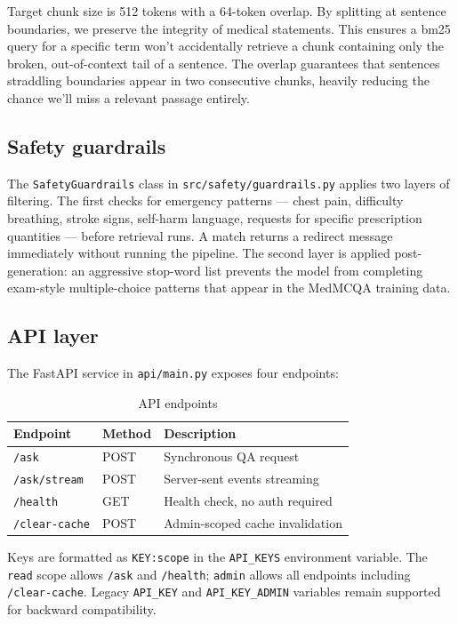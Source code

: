 Target chunk size is 512 tokens with a 64-token overlap. By splitting at sentence boundaries, we preserve the integrity of medical statements. This ensures a \ac{bm25} query for a specific term won't accidentally retrieve a chunk containing only the broken, out-of-context tail of a sentence. The overlap guarantees that sentences straddling boundaries appear in two consecutive chunks, heavily reducing the chance we'll miss a relevant passage entirely.

\subsection{Safety guardrails}

The \texttt{SafetyGuardrails} class in \texttt{src/safety/guardrails.py} applies two layers of filtering. The first checks for emergency patterns --- chest pain, difficulty breathing, stroke signs, self-harm language, requests for specific prescription quantities --- before retrieval runs. A match returns a redirect message immediately without running the pipeline. The second layer is applied post-generation: an aggressive stop-word list prevents the model from completing exam-style multiple-choice patterns that appear in the MedMCQA training data.

\subsection{API layer}

The FastAPI service in \texttt{api/main.py} exposes four endpoints:

\begin{table}[htbp]
\centering
\caption{API endpoints}
\renewcommand{\arraystretch}{1.3}
\begin{tabular}{|l|l|l|}
\hline
\textbf{Endpoint} & \textbf{Method} & \textbf{Description} \\
\hline
\texttt{/ask} & POST & Synchronous QA request \\
\texttt{/ask/stream} & POST & Server-sent events streaming \\
\texttt{/health} & GET & Health check, no auth required \\
\texttt{/clear-cache} & POST & Admin-scoped cache invalidation \\
\hline
\end{tabular}
\end{table}

Keys are formatted as \texttt{KEY:scope} in the \texttt{API\_KEYS} environment variable. The \texttt{read} scope allows \texttt{/ask} and \texttt{/health}; \texttt{admin} allows all endpoints including \texttt{/clear-cache}. Legacy \texttt{API\_KEY} and \texttt{API\_KEY\_ADMIN} variables remain supported for backward compatibility.
